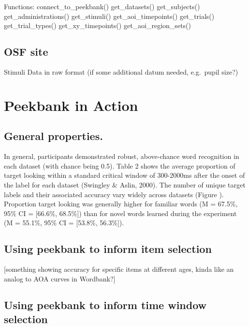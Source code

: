 \documentclass[
  english,
  man]{apa6}
\begin{document}
Functions:
connect\_to\_peekbank()
get\_datasets()
get\_subjects()
get\_administrations()
get\_stimuli()
get\_aoi\_timepoints()
get\_trials()
get\_trial\_types()
get\_xy\_timepoints()
get\_aoi\_region\_sets()

\hypertarget{osf-site}{%
\subsection{OSF site}\label{osf-site}}

Stimuli
Data in raw format (if some additional datum needed, e.g.~pupil size?)

\hypertarget{peekbank-in-action}{%
\section{Peekbank in Action}\label{peekbank-in-action}}

\hypertarget{general-properties.}{%
\subsection{General properties.}\label{general-properties.}}

In general, participants demonstrated robust, above-chance word recognition in each dataset (with chance being 0.5). Table 2 shows the average proportion of target looking within a standard critical window of 300-2000ms after the onset of the label for each dataset (Swingley \& Aslin, 2000). The number of unique target labels and their associated accuracy vary widely across datasets (Figure ). Proportion target looking was generally higher for familiar words (M = 67.5\%, 95\% CI = {[}66.6\%, 68.5\%{]}) than for novel words learned during the experiment (M = 55.1\%, 95\% CI = {[}53.8\%, 56.3\%{]}).

\hypertarget{using-peekbank-to-inform-item-selection}{%
\subsection{Using peekbank to inform item selection}\label{using-peekbank-to-inform-item-selection}}

{[}something showing accuracy for specific items at different ages, kinda like an analog to AOA curves in Wordbank?{]}

\hypertarget{using-peekbank-to-inform-time-window-selection}{%
\subsection{Using peekbank to inform time window selection}\label{using-peekbank-to-inform-time-window-selection}}
\end{document}
